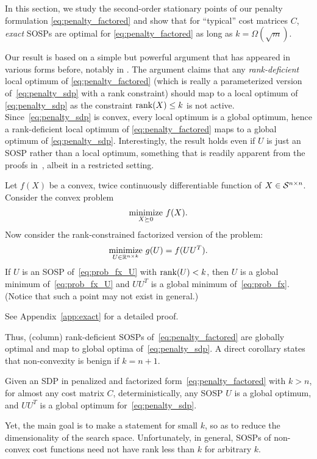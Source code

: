 In this section, we study the second-order stationary points of our penalty formulation \eqref{eq:penalty_factored} and show that for ``typical'' cost matrices $C$, {\em exact} SOSPs are optimal for \eqref{eq:penalty_factored} as long as $k={\Omega}(\sqrt{m})$. 

Our result is based on 	a simple but powerful argument that has appeared in various forms before, notably in \citep{burer2005local}. The argument claims that any {\em rank-deficient} local optimum of \eqref{eq:penalty_factored} (which is really a parameterized version of~\eqref{eq:penalty_sdp} with a rank constraint) should map to a local optimum of \eqref{eq:penalty_sdp} as the constraint $\operatorname{rank}(X) \leq k$ is not active. Since~\eqref{eq:penalty_sdp} is convex, every local optimum is a global optimum, hence a rank-deficient local optimum of \eqref{eq:penalty_factored} maps to a global optimum of \eqref{eq:penalty_sdp}. Interestingly, the result holds even if $U$ is just an SOSP rather than a local optimum, something that is readily apparent from the proofs in~\citep{journee2010low}, albeit in a restricted setting.
\begin{lemma}\label{lem:global}
	Let $f(X)$ be a convex, twice continuously differentiable function of $X \in \mathcal{S}^{n\times n}$. Consider the convex problem
	\begin{align}
		\underset{X \succeq 0}{\operatorname*{\mathrm{minimize}}}~ f(X).
		\label{eq:prob_fx}
	\end{align}
	Now consider the rank-constrained factorized version of the problem:
	\begin{align}
		\underset{U \in \mathbb{R}^{n \times k}}{\operatorname*{\mathrm{minimize}}} ~ g(U) = f(UU^T).
		\label{eq:prob_fx_U}
	\end{align}
	If $U$ is an SOSP of~\eqref{eq:prob_fx_U} with $\operatorname{rank}(U) < k$, then $U$ is a global minimum of~\eqref{eq:prob_fx_U} and $UU^T$ is a global minimum of~\eqref{eq:prob_fx}. (Notice that such a point may not exist in general.)
\end{lemma}
See Appendix~\ref{app:exact} for a detailed proof. 

Thus, (column) rank-deficient SOSPs of~\eqref{eq:penalty_factored} are globally optimal and map to global optima of~\eqref{eq:penalty_sdp}. A direct corollary states that non-convexity is benign if $k = n+1$.
\begin{corollary}
	Given an SDP in penalized and factorized form~\eqref{eq:penalty_factored} with $k > n$, for almost any cost matrix $C$, deterministically, any SOSP $U$ is a global optimum, and $UU^T$ is a global optimum for~\eqref{eq:penalty_sdp}.
\end{corollary}
Yet, the main goal is to make a statement for small $k$, so as to reduce the dimensionality of the search space. Unfortunately, in general, SOSPs of non-convex cost functions need not have rank less than $k$ for arbitrary $k$. 

